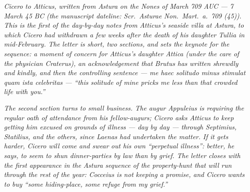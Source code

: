 
\textit{Cicero to Atticus, written from Astura on the
Nones of March 709 AUC --- 7 March 45 BC (the
manuscript dateline: \textit{Scr.\ Asturae Non.\ Mart.\
a.\ 709 (45)}). This is the first of the day-by-day
notes from Atticus's seaside villa at Astura, to which
Cicero had withdrawn a few weeks after the death of
his daughter Tullia in mid-February. The letter is
short, two sections, and sets the keynote for the
sequence: a moment of concern for Atticus's daughter
Attica (under the care of the physician Craterus), an
acknowledgement that Brutus has written shrewdly and
kindly, and then the controlling sentence ---
\textit{me haec solitudo minus stimulat quam ista
celebritas} --- ``this solitude of mine pricks me less
than that crowded life with you.''}

\textit{The second section turns to small business.
The augur Appuleius is requiring the regular oath of
attendance from his fellow-augurs; Cicero asks Atticus
to keep getting him excused on grounds of illness ---
day by day --- through Septimius, Statilius, and the
others, since Laenas had undertaken the matter. If it
gets harder, Cicero will come and swear out his own
``perpetual illness'': better, he says, to seem to
shun dinner-parties by law than by grief. The letter
closes with the first appearance in the Astura
sequence of the property-hunt that will run through
the rest of the year: Cocceius is not keeping a
promise, and Cicero wants to buy ``some hiding-place,
some refuge from my grief.''}
